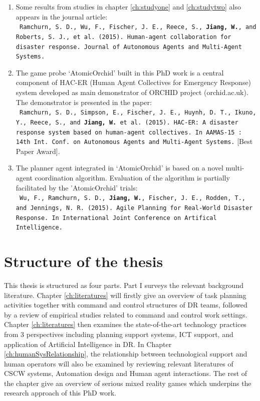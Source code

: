 \begin{enumerate}
\item Some results from studies in chapter \ref{ch:studyone} and \ref{ch:studytwo} also appears in the journal article:\\
\texttt{ \footnotesize Ramchurn, S. D., Wu, F., Fischer, J. E., Reece, S., \textbf{Jiang, W.}, and Roberts, S. J., et al. (2015). Human-agent collaboration for disaster response. Journal of Autonomous Agents and Multi-Agent Systems.}\\

\item The game probe `AtomicOrchid' built in this PhD work is a central component of HAC-ER (Human Agent Collectives for Emergency Response) system  developed as main demonstrator of ORCHID project (orchid.ac.uk). The demonstrator is presented in the paper:\\
\texttt{ \footnotesize Ramchurn, S. D., Simpson, E., Fischer, J. E., Huynh, D. T., Ikuno, Y., Reece, S., and \textbf{ Jiang, W.} et al. (2015). HAC-ER: A disaster response system based on human-agent collectives. In AAMAS-15 : 14th Int. Conf. on Autonomous Agents and Multi-Agent Systems.} [Best Paper Award].\\ 

\item The planner agent integrated in `AtomicOrchid' is based on a novel multi-agent coordination algorithm. Evaluation of the algorithm is partially facilitated by the 'AtomicOrchid' trials:\\
 \texttt{ \footnotesize Wu, F., Ramchurn, S. D., \textbf{Jiang, W.}, Fischer, J. E., Rodden, T., and Jennings, N. R. (2015). Agile Planning for Real-World Disaster Response. In International Joint Conference on Artifical Intelligence.}

\end{enumerate} 

\section{Structure of the thesis}
This thesis is structured as four parts. Part I surveys the relevant background literature. Chapter \ref{ch:literatures} will firstly give an overview of task planning activities together with command and control structures of \ac{DR} teams, followed by a review of empirical studies related to command and control work settings. Chapter \ref{ch:literatures} then examines the state-of-the-art technology practices from 3 perspectives including planning support systems, \ac{ICT} support, and application of Artificial Intelligence in \ac{DR}. In Chapter \ref{ch:humanSysRelationship}, the relationship between technological support and human operators will also be examined by reviewing relevant literatures of \ac{CSCW} systems, Automation design and Human agent interactions. The rest of the chapter give an overview of serious mixed reality games which underpins the research approach of this PhD work.\\

